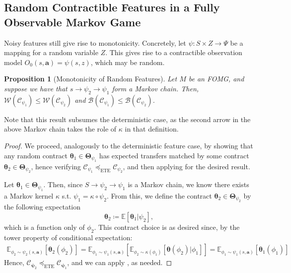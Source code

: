 \documentclass[referee,sn-basic]{sn-jnl}
\newcommand{\bld}[1]{\boldsymbol{#1}}
\newcommand{\btheta}{\boldsymbol{\theta}}
\newcommand{\bTheta}{\boldsymbol{\Theta}}
\theoremstyle{thmstyleone}%
\newtheorem{proposition}[theorem]{Proposition}%
\theoremstyle{thmstyletwo}%
\theoremstyle{thmstylethree}%
\begin{document}
\subsection{Random Contractible Features in a Fully Observable Markov Game}
Noisy features still give rise to monotonicity. Concretely, let $\psi: S \times Z \to \Psi$ be a mapping for a random variable $Z$. This gives rise to a contractible observation model $O_0 (s, \mathbf a) = \psi (s, z)$, which may be random.
\begin{proposition}[Monotonicity of Random Features]\label{thm:randomfeat}
    Let $M$ be an FOMG, and suppose we have that $s \to \psi_2 \to \psi_1$ form a Markov chain. Then, $\mathcal{W}(\mathcal{C}_{\psi_1}) \le \mathcal{W}(\mathcal{C}_{\psi_2})$ and $\mathcal{B}(\mathcal{C}_{\psi_1}) \le \mathcal{B}(\mathcal{C}_{\psi_2})$. 
\end{proposition}
Note that this result subsumes the deterministic case, as the second arrow in the above Markov chain takes the role of $\kappa$ in that definition.
\begin{proof}
    We proceed, analogously to the deterministic feature case, by showing that any random contract $\btheta_1 \in \bTheta_{{\psi}_1}$ has expected transfers matched by some contract $\btheta_2 \in \bTheta_{{\psi}_2}$, hence verifying $\mathcal{C}_{\psi_1} \preceq_{\operatorname{ETE}} \mathcal{C}_{\psi_2}$, and then applying  for the desired result. 

    Let $\btheta_1 \in \bTheta_{{\psi}_1}$. Then, since $S \to {\psi_2} \to {\psi_1}$ is a Markov chain, we know there exists a Markov kernel $\kappa$ s.t. $\psi_1 = \kappa \circ \psi_2$. From this, we define the contract $\btheta_{2} \in \bTheta_{\psi_2}$ by the following expectation
    \[
    \btheta_{2} \coloneqq  \mathbb{E}[\btheta_1|\psi_2],
    \]
    which is a function only of $\phi_2$. This contract choice is as desired since, by the tower property of conditional expectation:
    \begin{align*}
        \mathbb{E}_{\phi_2 \sim \psi_2(s, \mathbf{a})}[\btheta_2(\phi_2)] = \mathbb{E}_{\phi_1 \sim \psi_1(s, \mathbf{a})}[\mathbb{E}_{\phi_2 \sim \kappa(\phi_1)}[\btheta(\phi_2)|\phi_1]] = \mathbb{E}_{\phi_1 \sim \psi_1(s, \mathbf{a})}[\btheta_1(\phi_1)]
    \end{align*}
    Hence, $\mathcal{C}_{\bld \psi_2} \preceq_{\operatorname{ETE}} \mathcal{C}_{\bld \psi_1}$, and we can apply , as needed.
\end{proof}
\end{document}
